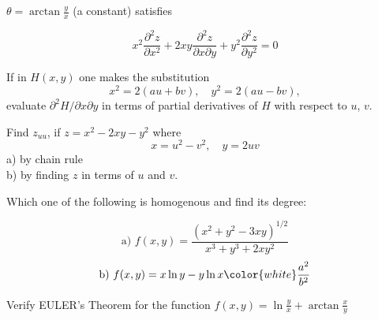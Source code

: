 \documentclass[11pt]{amsbook}
\begin{document}

$\theta = \arctan{\frac{y}{x}}$ (a constant) satisfies

\begin{equation*}
	x^2 \frac{\partial^2 z}{\partial x^2} + 2xy \frac{\partial^2 z}{\partial x \partial y} + y^2 \frac{\partial^2 z}{\partial y^2} = 0
\end{equation*}

\begin{exmp}
	If in $H(x,y)$ one makes the substitution
	\begin{equation*}
		x^2 = 2(au+bv), \quad y^2 = 2(au-bv),
	\end{equation*}
	evaluate $\partial^2 H / \partial x \partial y$ in terms of partial derivatives of $H$ with respect to $u$, $v$.
\end{exmp}

\begin{exmp}
	Find $z_{uu}$, if $z = x^2 - 2xy - y^2$ where
	\begin{equation*}
		x = u^2 - v^2, \quad y = 2uv
	\end{equation*}
	a) by chain rule\\
	b) by finding $z$ in terms of $u$ and $v$.
\end{exmp}

\begin{exmp}
	Which one of the following is homogenous and find its degree:
	\begin{multicols}{2}
		\noindent
		\begin{equation*}
			\text{a) } f(x, y) = \frac{(x^2 + y^2 - 3xy)^{1/2}}{x^3 + y^3 + 2xy^2}
		\end{equation*}
		\columnbreak
		\begin{equation*}
			\text{b) } f(x, y) = x \ln y-y \ln x \color{white} \frac{a^2}{b^2} %
		\end{equation*}
	\end{multicols}
\end{exmp}

\begin{exmp}
	Verify EULER's Theorem for the function $f(x,y) = \ln \frac{y}{x} + \arctan \frac{x}{y}$ %
\end{exmp}
\end{document}
